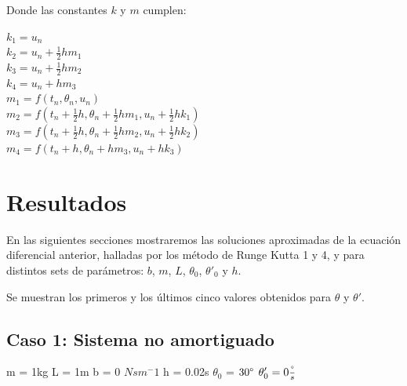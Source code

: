 \documentclass[titlepage,a4paper]{article}
\begin{document}
Donde las constantes $k$ y $m$ cumplen:

\begin{multicols}{2}
\centering
$k_1 = u_n$\\
$k_2 = u_n + \frac{1}{2}hm_1$\\
$k_3 = u_n + \frac{1}{2}hm_2$\\
$k_4 = u_n + hm_3$\\
\columnbreak
$m_1 = f(t_n, \theta_n, u_n)$\\
$m_2 = f(t_n +\frac{1}{2}h, \theta_n+\frac{1}{2}hm_1, u_n+\frac{1}{2}hk_1)$ \\
$m_3 = f(t_n +\frac{1}{2}h, \theta_n+\frac{1}{2}hm_2, u_n+\frac{1}{2}hk_2)$ \\
$m_4 = f(t_n +h, \theta_n+hm_3, u_n+hk_3)$ \\
\end{multicols}

\newpage

\section{Resultados}

En las siguientes secciones mostraremos las soluciones aproximadas de la ecuación diferencial anterior, halladas por los método de Runge Kutta 1 y 4, y para distintos sets de parámetros: $b$, $m$, $L$, $\theta_0$, $\theta'_0$ y $h$.

Se muestran los primeros y los últimos cinco valores obtenidos para $\theta$ y $\theta'$.

\subsection{Caso 1: Sistema no amortiguado}

\begin{center}
    m = 1kg \hspace{3mm}
    L = 1m \hspace{3mm}
    b = 0 $Nsm^-1$ \hspace{3mm}
    h = 0.02s \hspace{3mm}
    $\theta_0$ = $30\degree$ \hspace{3mm}
    $\theta'_0 = 0\frac{\degree}{s}$ \hspace{3mm}
\end{center}
\end{document}
